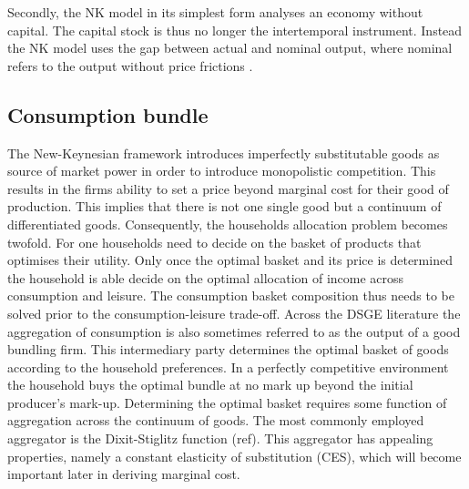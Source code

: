 \documentclass[12pt,a4paper,english]{article} %
\begin{document}
	Secondly, the NK model in its simplest form analyses an economy without capital. The capital stock is thus no longer the intertemporal instrument. Instead the NK model uses the gap between actual and nominal output, where nominal refers to the output without price frictions \cite{gali_monetary_2008}.
	
	\subsection{Consumption bundle}
	The New-Keynesian framework introduces imperfectly substitutable goods as source of market power in order to introduce monopolistic competition. This results in the firms ability to set a price beyond marginal cost for their good of production. This implies that there is not one single good but a continuum of differentiated goods. Consequently, the households allocation problem becomes twofold.
	For one households need to decide on the basket of products that optimises their utility. Only once the optimal basket and its price is determined the household is able decide on the optimal allocation of income across consumption and leisure. The consumption basket composition thus needs to be solved prior to the consumption-leisure trade-off. 
	Across the DSGE literature the aggregation of consumption is also sometimes referred to as the output of a good bundling firm. This intermediary party determines the optimal basket of goods according to the household preferences. In a perfectly competitive environment the household buys the optimal bundle at no mark up beyond the initial producer's mark-up.
	Determining the optimal basket requires some function of aggregation across the continuum of goods. The most commonly employed aggregator is the Dixit-Stiglitz function (ref). This aggregator has appealing properties, namely a constant elasticity of substitution (CES), which will become important later in deriving marginal cost.
	
\end{document}
